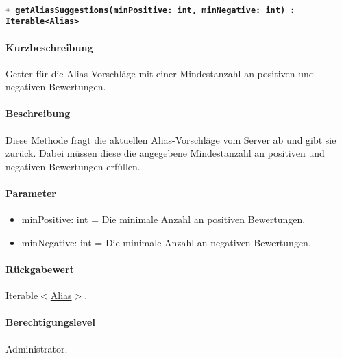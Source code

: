 \paragraph{\texttt{+ getAliasSuggestions(minPositive: int, minNegative: int) : Iterable<Alias>}}\label{AP_Backend_getAliasSuggestions}%
\paragraph*{Kurzbeschreibung}
Getter für die Alias-Vorschläge mit einer Mindestanzahl an positiven und negativen Bewertungen.
\paragraph*{Beschreibung}
Diese Methode fragt die aktuellen Alias-Vorschläge vom Server ab und gibt sie zurück.
Dabei müssen diese die angegebene Mindestanzahl an positiven und negativen Bewertungen erfüllen.
\paragraph*{Parameter}
\begin{itemize}
    \item minPositive: int = Die minimale Anzahl an positiven Bewertungen.
    \item minNegative: int = Die minimale Anzahl an negativen Bewertungen.
\end{itemize}
\paragraph*{Rückgabewert}
Iterable$<$\hyperref[AP_Alias]{Alias}$>$.
\paragraph*{Berechtigungslevel}
Administrator.
